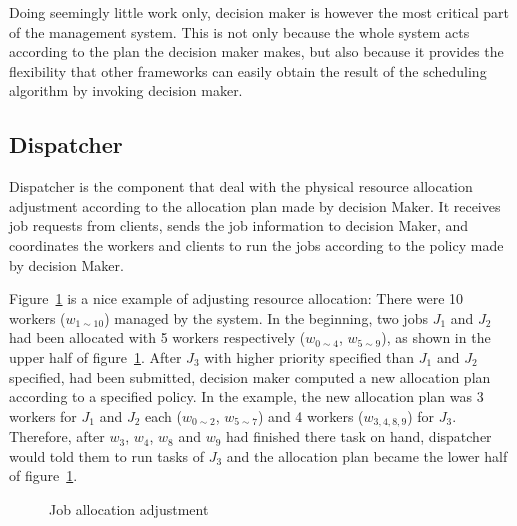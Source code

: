 Doing seemingly little work only, decision maker is however the most
critical part of the management system.
This is not only because the whole system acts according to the plan the
decision maker makes, but also because it provides the flexibility that
other frameworks can easily obtain the result of the scheduling
algorithm by invoking decision maker.

\subsection{Dispatcher}

Dispatcher is the component that deal with the physical resource
allocation adjustment according to the allocation plan made by decision
Maker.
It receives job requests from clients, sends the job information to
decision Maker, and coordinates the workers and clients to run the jobs
according to the policy made by decision Maker.

Figure~\ref{fig:allocation-adjustment} is a nice example of adjusting
resource allocation: There were 10 workers ($w_{1\sim10}$) managed by
the system.
In the beginning, two jobs $J_1$ and $J_2$ had been allocated with 5
workers respectively ($w_{0\sim4}$, $w_{5\sim9}$), as shown in the upper
half of figure~\ref{fig:allocation-adjustment}.
After $J_3$ with higher priority specified than $J_1$ and $J_2$
specified, had been submitted, decision maker computed a new allocation
plan according to a specified policy.
In the example, the new allocation plan was 3 workers for $J_1$ and
$J_2$ each ($w_{0\sim2}$, $w_{5\sim7}$) and 4 workers ($w_{3,4,8,9}$)
for $J_3$.
Therefore, after $w_3$, $w_4$, $w_8$ and $ w_9$ had finished there task
on hand, dispatcher would told them to run tasks of $J_3$ and the
allocation plan became the lower half of
figure~\ref{fig:allocation-adjustment}.

\begin{figure}
  \centering
  
  \caption{Job allocation adjustment}
  \label{fig:allocation-adjustment}
\end{figure}
